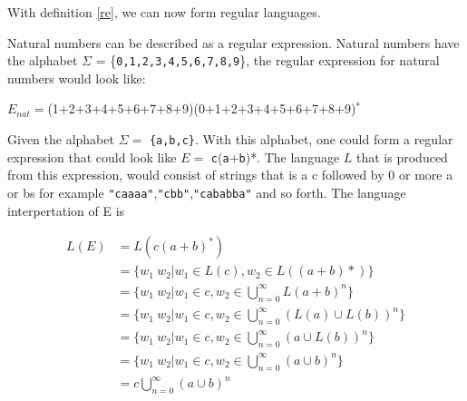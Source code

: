 With definition \ref{re}, we can now form regular languages. 
\begin{myex}Natural numbers can be described as a regular expression. Natural numbers have the alphabet $\Sigma$ = \{{\tt 0,1,2,3,4,5,6,7,8,9}\}, the regular expression for natural numbers would look like:
\begin{center}
$E_{nat} = $(1+2+3+4+5+6+7+8+9)(0+1+2+3+4+5+6+7+8+9)$^*$
\end{center}
\end{myex}

\begin{myex}
Given the alphabet $\Sigma =$ {\tt\{a,b,c\}}. With this alphabet, one could form a regular expression that could look like $E =$ {\tt c}({\tt a}+{\tt b})*. The language $L$ that is produced from this expression, would consist of strings that is a c followed by 0 or more a or bs for example {\tt "caaaa"},{\tt "cbb"},{\tt "cababba"} and so forth. The language interpertation of E is 
\begin{center}
\begin{align*}
L(E) &= L(c(a+b)^*)\\
	 &= \{w_1 ~w_2|w_1 \in L(c),w_2 \in L((a+b)*)\}\\
	 &= \{w_1~ w_2|w_1 \in c, w_2 \in \bigcup\limits_{n=0}^\infty L(a+b)^n \}\\
	 &= \{w_1~ w_2|w_1 \in c, w_2 \in \bigcup\limits_{n=0}^\infty (L(a) \cup L(b))^n \}\\
	 &= \{w_1~ w_2|w_1 \in c, w_2 \in \bigcup\limits_{n=0}^\infty (a \cup L(b))^n \}\\
	 &= \{w_1~ w_2|w_1 \in c, w_2 \in \bigcup\limits_{n=0}^\infty (a \cup b)^n \}\\
	 &= c \bigcup\limits_{n=0}^\infty (a \cup b)^n 
\end{align*}
\end{center}
\end{myex}